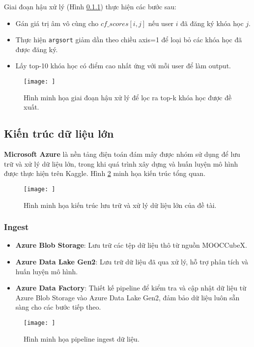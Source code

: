 Giai đoạn hậu xử lý (Hình \ref{}) thực hiện các bước sau:
\begin{itemize}
    \item Gán giá trị âm vô cùng cho $cf\_scores[i,j]$ nếu user $i$ đã đăng ký khóa học $j$.
    \item Thực hiện \texttt{argsort} giảm dần theo chiều axis=1 để loại bỏ các khóa học đã được đăng ký.
    \item Lấy top-10 khóa học có điểm cao nhất ứng với mỗi user để làm output.
\end{itemize}

\begin{figure}[ht]
    \centering
    \texttt{[image: ]}
    \caption{Hình minh họa giai đoạn hậu xử lý để lọc ra top-k khóa học được đề xuất.}
    \label{fig:hinh4_2}
\end{figure}

\subsection{Kiến trúc dữ liệu lớn}
\textbf{Microsoft Azure} là nền tảng điện toán đám mây được nhóm sử dụng để lưu trữ và xử lý dữ liệu lớn, trong khi quá trình xây dựng và huấn luyện mô hình được thực hiện trên Kaggle. Hình \ref{fig:hinh4_3} minh họa kiến trúc tổng quan.

\begin{figure}[ht]
    \centering
    \texttt{[image: ]}
    \caption{Hình minh họa kiến trúc lưu trữ và xử lý dữ liệu lớn của đề tài.}
    \label{fig:hinh4_3}
\end{figure}

\subsubsection{Ingest}
\begin{itemize}
    \item \textbf{Azure Blob Storage}: Lưu trữ các tệp dữ liệu thô từ nguồn MOOCCubeX.
    \item \textbf{Azure Data Lake Gen2}: Lưu trữ dữ liệu đã qua xử lý, hỗ trợ phân tích và huấn luyện mô hình.
    \item \textbf{Azure Data Factory}: Thiết kế pipeline để kiểm tra và cập nhật dữ liệu từ Azure Blob Storage vào Azure Data Lake Gen2, đảm bảo dữ liệu luôn sẵn sàng cho các bước tiếp theo.
\end{itemize}

\begin{figure}[ht]
    \centering
    \texttt{[image: ]}
    \caption{Hình minh họa pipeline ingest dữ liệu.}
    \label{fig:hinh4_6}
\end{figure}

